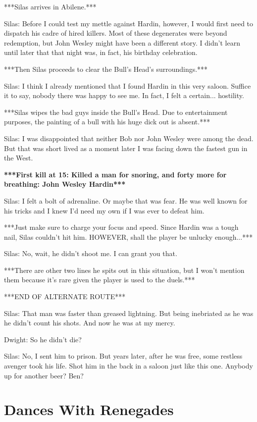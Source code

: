 \documentclass{article}
\begin{document}
***Silas arrives in Abilene.***

Silas: Before I could test my mettle against Hardin, however, I would first need to dispatch his cadre of hired killers. Most of these degenerates were beyond redemption, but John Wesley might have been a different story. I didn't learn until later that that night was, in fact, his birthday celebration.

***Then Silas proceeds to clear the Bull's Head's surroundings.***

Silas: I think I already mentioned that I found Hardin in this very saloon. Suffice it to say, nobody there was happy to see me. In fact, I felt a certain... hostility.

***Silas wipes the bad guys inside the Bull's Head. Due to entertainment purposes, the painting of a bull with his huge dick out is absent.***

Silas: I was disappointed that neither Bob nor John Wesley were among the dead. But that was short lived as a moment later I was facing down the fastest gun in the West.

\textbf{***First kill at 15: Killed a man for snoring, and forty more for breathing: John Wesley Hardin***}

Silas: I felt a bolt of adrenaline. Or maybe that was fear. He was well known for his tricks and I knew I'd need my own if I was ever to defeat him.

***Just make sure to charge your focus and speed. Since Hardin was a tough nail, Silas couldn't hit him. HOWEVER, shall the player be unlucky enough...***

Silas: No, wait, he didn't shoot me. I can grant you that.

***There are other two lines he spits out in this situation, but I won't mention them because it's rare given the player is used to the duels.***

***END OF ALTERNATE ROUTE***

Silas: That man was faster than greased lightning. But being inebriated as he was he didn't count his shots. And now he was at my mercy.

Dwight: So he didn't die?

Silas: No, I sent him to prison. But years later, after he was free, some restless avenger took his life. Shot him in the back in a saloon just like this one. Anybody up for another beer? Ben?

\section*{Dances With Renegades}
\end{document}
